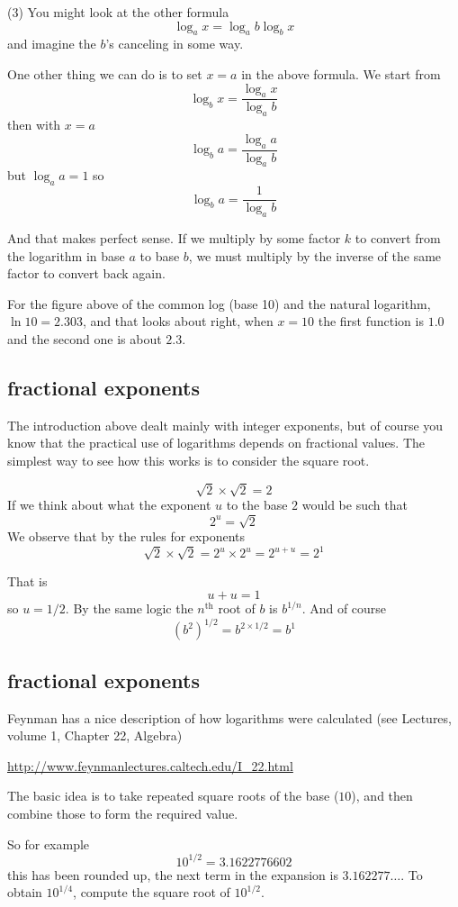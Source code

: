\documentclass[11pt, oneside]{article}
\begin{document}
(3) You might look at the other formula
\[ \log_a x = \log_a b \log_b x  \]
and imagine the $b$'s canceling in some way.

One other thing we can do is to set $x=a$ in the above formula.  We start from
\[ \log_b x = \frac{\log_a x}{\log_a b} \]
then with $x=a$
\[ \log_b a = \frac{\log_a a}{\log_a b} \]
but $\log_a a = 1$ so
\[ \log_b a = \frac{1}{\log_a b} \]

And that makes perfect sense.  If we multiply by some factor $k$ to convert from the logarithm in base $a$ to base $b$, we must multiply by the inverse of the same factor to convert back again.

For the figure above of the common log (base 10) and the natural logarithm, $\ln 10 = 2.303$, and that looks about right, when $x=10$ the first function is $1.0$ and the second one is about $2.3$.

\subsection*{fractional exponents}
The introduction above dealt mainly with integer exponents, but of course you know that the practical use of logarithms depends on fractional values.  The simplest way to see how this works is to consider the square root.

\[ \sqrt{2} \times \sqrt{2} = 2 \]
If we think about what the exponent $u$ to the base $2$ would be such that
\[ 2^u = \sqrt{2} \]
We observe that by the rules for exponents
\[ \sqrt{2} \times \sqrt{2} = 2^u \times 2^u = 2^{u+u} = 2^1 \]

That is
\[ u + u = 1 \]
so $u = 1/2$.  By the same logic the $n^{\text{th}}$ root of $b$ is $b^{1/n}$.  And of course 
\[ (b^2)^{1/2} = b^{2 \times 1/2} = b^1 \]

\subsection*{fractional exponents}

Feynman has a nice description of how logarithms were calculated (see Lectures, volume 1, Chapter 22, Algebra)

\url{http://www.feynmanlectures.caltech.edu/I_22.html}

The basic idea is to take repeated square roots of the base ($10$), and then combine those to form the required value.

So for example
\[ 10^{1/2} = 3.1622776602 \]
this has been rounded up, the next term in the expansion is $3.162277 \dots$.  To obtain $10^{1/4}$, compute the square root of $10^{1/2}$.
\end{document}
